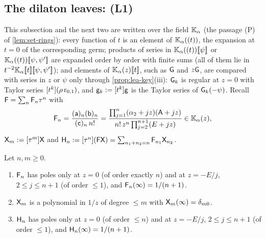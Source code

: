 \subsection{The dilaton leaves: (L1)}
\label{sec:lea-L1}

This subsection and the next two are written over the field $\mathbb{K}_{\alpha}$ (the passage (P) of \cref{lem:set-rings}): every function of $t$ is an element of $\mathbb{K}_{\alpha}((t))$, the expansion at $t = 0$ of the corresponding germ; products of series in $\mathbb{K}_{\alpha}((t))[\![ \psi ]\!]$ or $\mathbb{K}_{\alpha}((t))[\![ \psi,\psi' ]\!]$ are expanded order by order with finite sums (all of them lie in $t^{-2}\mathbb{K}_{\alpha}[\![ t ]\!][\![ \psi,\psi' ]\!]$); and elements of $\mathbb{K}_{\alpha}(z)[\![ t ]\!]$, such as $\mathsf{G}$ and $z\mathsf{G}$, are compared with series in $z$ or $\psi$ only through \cref{prop:lea-key}(iii): $\mathsf{G}_k$ is regular at $z = 0$ with Taylor series $[t^k](\rho\,\mathrm{r}_{0,1})$, and $\mathsf{g}_k := [t^k]\mathsf{g}$ is the Taylor series of $\mathsf{G}_k(-\psi)$. Recall $\mathsf{F} = \sum_n\mathsf{F}_n\tau^n$ with
\[
\mathsf{F}_n = \frac{(\mathsf{a})_n(\mathsf{b})_n}{(\mathsf{c})_n\,n!} = \frac{\prod_{j=1}^{n}(\alpha_2+jz)(\mathsf{A}+jz)}{n!\,z^n\prod_{j=2}^{n+1}(E+jz)}\in\mathbb{K}_{\alpha}(z),
\]
$\mathsf{X}_m := [\tau^m]\mathsf{X}$ and $\mathsf{H}_n := [\tau^n](\mathsf{F}\mathsf{X}) = \sum_{n_1+n_2 = n}\mathsf{F}_{n_1}\mathsf{X}_{n_2}$.

\begin{lem}
\label{lem:lea-taucoef}
Let $n,m\geq 0$.
\begin{enumerate}
\item $\mathsf{F}_n$ has poles only at $z = 0$ (of order exactly $n$) and at $z = -E/j$, $2\leq j\leq n+1$ (of order $\leq 1$), and $\mathsf{F}_n(\infty) = 1/(n+1)$.
\item $\mathsf{X}_m$ is a polynomial in $1/z$ of degree $\leq m$ with $\mathsf{X}_m(\infty) = \delta_{m0}$.
\item $\mathsf{H}_n$ has poles only at $z = 0$ (of order $\leq n$) and at $z = -E/j$, $2\leq j\leq n+1$ (of order $\leq 1$), and $\mathsf{H}_n(\infty) = 1/(n+1)$.
\end{enumerate}
\end{lem}

